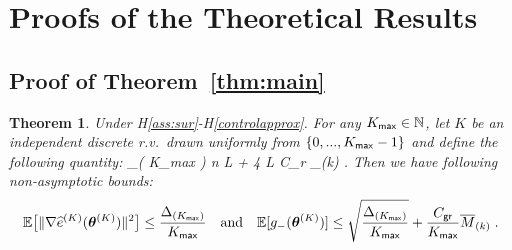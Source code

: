 \documentclass[11pt]{article}
\newtheorem*{Theorem*}{Theorem}
\theoremstyle{t}
\begin{document}



\newpage

\appendix

\section{Proofs of the Theoretical Results}
\subsection{Proof of Theorem~\ref{thm:main}}
\begin{Theorem*}
Under H\ref{ass:sur}-H\ref{controlapprox}. For any $K_{\sf max} \in \NN$, let $K$ be an independent discrete r.v.~drawn uniformly from $\{0,...,K_{\sf max}-1\}$ and define the following quantity:
\beq\notag
\Delta_{( K_{\sf max} )}  n L  +  4 L C_{\sf r} _{(k)} \eqsp.
\eeq
Then we have following non-asymptotic bounds:
\begin{align} \notag
 \EE \big[ \| \grd \eSur{K}{\hp{K}} \|^2 \big]  \leq \frac{\Delta_{( K_{\sf max} )}}{K_{\sf max}} \quad \textrm{and} \quad \EE[ g_-( \hp{K} ) ]  \leq \sqrt{\frac{ \Delta_{( K_{\sf max} )} }{ K_{\sf max} }} + \frac{C_{\sf gr}}{K_{\sf max}}  \overline{M}_{(k)} \eqsp.
\end{align}
\end{Theorem*}
\end{document}
